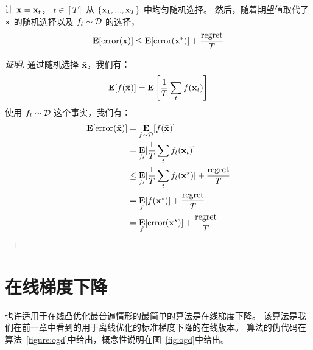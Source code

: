 \begin{lemma}
让  $\xbar =  \x_t$， $t \in [T] $ 从  $\{\x_1,...,\x_T\}$ 中均匀随机选择。%
然后，随着期望值取代了 $\xbar$ 的随机选择以及 $f_t \sim \D$ 的选择，
$$ \E [ \err(\bar{\x}) ]  \leq \E [ \err(\x^* ) ]  +  \frac{\regret}{T} $$
\end{lemma}
\begin{proof}[证明]
通过随机选择 $\xbar$，我们有：
$$ \E [ f(\xbar) ] =  \E\left[ \frac{1}{T} \sum_t f(\x_t) \right]$$
使用  $f_t \sim \D$ 这个事实，我们有：
\begin{eqnarray*}
\E  [ \err(\xbar) ]  & = \E_{f \sim \D} [ f(\xbar)]  \\
& =  \E_{f_t} [ \frac{1}{T} \sum_t  f_t(\x_t)]  \\
& \leq  \E_{f_t} [ \frac{1}{T} \sum_t  f_t(\x^\star) ]  + \frac{\regret}{T} \\
& =  \E_{f} [ f(\x^\star) ]  + \frac{\regret}{T} \\
& = \E_f [ \err(\x^\star)] + \frac{\regret}{T} 
\end{eqnarray*}
\end{proof}
 



\section{
在线梯度下降
} \label{section:ogd}

也许适用于在线凸优化最普遍情形的最简单的算法是在线梯度下降。
该算法是我们在前一章中看到的用于离线优化的标准梯度下降的在线版本。
算法的伪代码在算法~\ref{figure:ogd}中给出，概念性说明在图~\ref{fig:ogd}中给出。

